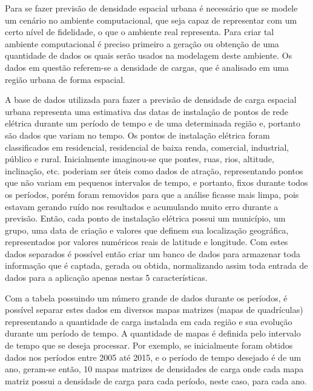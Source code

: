 Para se fazer previsão de densidade espacial urbana é necessário que se modele um cenário no ambiente computacional, que seja capaz de representar com um certo nível de fidelidade, o que o ambiente real representa. Para criar tal ambiente computacional é preciso primeiro a geração ou obtenção de uma quantidade de dados os quais serão usados na modelagem deste ambiente. Os dados em questão referem-se a densidade de cargas, que é analisado em uma região urbana de forma espacial. 

A base de dados utilizada para fazer a previsão de densidade de carga espacial urbana representa uma estimativa das datas de instalação de pontos de rede elétrica  durante um período de tempo e de uma determinada região e, portanto são dados que variam no tempo. Os pontos de instalação elétrica foram classificados em residencial, residencial de baixa renda, comercial, industrial, público e rural. Inicialmente imaginou-se que pontes, ruas, rios, altitude, inclinação, etc. poderiam ser úteis como dados de atração, representando pontos que não variam em pequenos intervalos de tempo, e portanto, fixos durante todos os períodos, porém foram removidos para que a análise ficasse mais limpa, pois estavam gerando ruído nos resultados e acumulando muito erro durante a previsão. Então, cada ponto de instalação elétrica possui um município, um grupo, uma data de criação e valores que definem sua localização geográfica, representados por valores numéricos reais de latitude e longitude. Com estes dados separados é possível então criar um banco de dados para armazenar toda informação que é captada, gerada ou obtida, normalizando assim toda entrada de dados para a aplicação apenas nestas 5 características.

Com a tabela possuindo um número grande de dados durante os períodos, é possível separar estes dados em diversos mapas matrizes (mapas de quadrículas) representando a quantidade de carga instalada em cada região e sua evolução durante um período de tempo. A quantidade de mapas é definida pelo intervalo de tempo que se deseja processar. Por exemplo, se inicialmente foram obtidos dados nos períodos entre 2005 até 2015, e o período de tempo desejado é de um ano, geram-se então, 10 mapas matrizes de densidades de carga onde cada mapa matriz possui a densidade de carga para cada período, neste caso, para cada ano.

